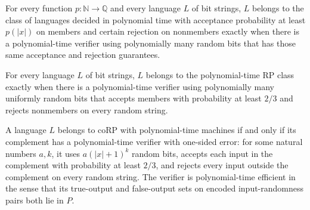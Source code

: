 \begin{theorem}
\label{Randomized.mem_RP_PTMWith_iff}
\leanok
{}
For every function $p:\mathbb{N}\to\mathbb{Q}$ and every language $L$ of bit strings,
$L$ belongs to the class of languages decided in polynomial time with acceptance
probability at least $p(|x|)$ on members and certain rejection on nonmembers exactly
when there is a polynomial-time verifier using polynomially many random bits that has
those same acceptance and rejection guarantees.
\end{theorem}

\begin{theorem}
\label{Randomized.mem_RP_PTM_iff}
\leanok
{}
For every language $L$ of bit strings, $L$ belongs to the polynomial-time RP class
exactly when there is a polynomial-time verifier using polynomially many uniformly
random bits that accepts members with probability at least $2/3$ and rejects nonmembers
on every random string.
\end{theorem}

\begin{theorem}
\label{Randomized.mem_coRP_PTM_iff}
\leanok
{}
A language $L$ belongs to coRP with polynomial-time machines if and only if its
complement has a polynomial-time verifier with one-sided error: for some natural numbers
$a,k$, it uses $a(|x|+1)^k$ random bits, accepts each input in the complement with
probability at least $2/3$, and rejects every input outside the complement on every
random string. The verifier is polynomial-time efficient in the sense that its
true-output and false-output sets on encoded input-randomness pairs both lie in $P$.
\end{theorem}

